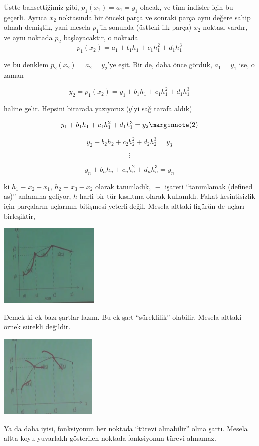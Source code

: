 \documentclass[12pt,fleqn]{article}\usepackage{../../common}
\begin{document}
Üstte bahsettiğimiz gibi, $p_1(x_1) = a_1 = y_1$ olacak, ve tüm indisler
için bu geçerli. Ayrıca $x_2$ noktasında bir önceki parça ve sonraki parça
aynı değere sahip olmalı demiştik, yani mesela $p_1$'in sonunda (üstteki
ilk parça) $x_2$ noktası vardır, ve aynı noktada $p_2$ başlayacaktır, o
noktada $$ p_1(x_2) = a_1 + b_1h_1 + c_1h_1^2 + d_1h_1^3  $$

ve bu denklem $p_2(x_2) = a_2 = y_2$'ye eşit. Bir de, daha önce gördük, $a_1 =
y_1$ ise, o zaman 

$$ y_2 = p_1(x_2) = y_1 + b_1h_1 + c_1h_1^2 + d_1h_1^3 $$

haline gelir. Hepsini birarada yazıyoruz ($y$'yi sağ tarafa aldık)

$$ y_1 + b_1h_1 + c_1h_1^2 + d_1h_1^3 = y_2 
\mlabel{2} 
$$

$$ y_2 + b_2h_2 + c_2h_2^2 + d_2h_2^3 = y_3 $$

$$ \vdots $$

$$ y_n + b_nh_n + c_nh_n^2 + d_nh_n^3 = y_n $$

ki $h_1 \equiv x_2 - x_1$, $h_2 \equiv x_3 - x_2$ olarak tanımladık,
$\equiv$ işareti ``tanımlamak (defined as)'' anlamına geliyor, $h$
harfi bir tür kısaltma olarak kullanıldı. Fakat kesintisizlik için
parçaların uçlarının bitişmesi yeterli değil. Mesela alttaki figürün de
uçları birleşiktir,

\includegraphics[height=4cm]{spline3.png}

Demek ki ek bazı şartlar lazım. Bu ek şart ``süreklilik'' olabilir. Mesela
alttaki örnek sürekli değildir.

\includegraphics[height=4cm]{spline5.png}

Ya da daha iyisi, fonksiyonun her noktada ``türevi alınabilir'' olma
şartı. Mesela altta koyu yuvarlaklı gösterilen noktada fonksiyonun türevi
alınamaz.
\end{document}
